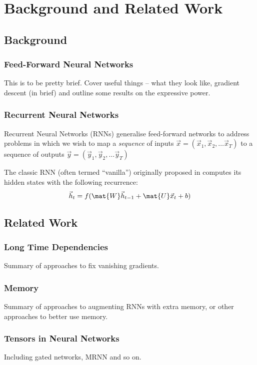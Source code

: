 \chapter{Background and Related Work}\label{C:bg}
\section{Background}
\subsection{Feed-Forward Neural Networks}
This is to be pretty brief. Cover useful things -- what they look like, gradient descent
(in brief) and outline some results on the expressive power.
\subsection{Recurrent Neural Networks}
Recurrent Neural Networks (RNNs) generalise feed-forward networks to address problems 
in which we wish to map a \emph{sequence} of inputs 
\(\vec{x} = (\vec{x}_1, \vec{x}_2, \dots \vec{x}_T) \) to a sequence of outputs
\(\vec{y} = (\vec{y}_1, \vec{y}_2, \dots \vec{y}_T) \)


The classic RNN (often termed ``vanilla'') originally proposed in \autocite{ElmanXXXX}
computes its hidden states with the following recurrence:
\begin{equation}
	\vec{h}_t = f(\mat{W}\vec{h}_{t-1} + \mat{U}\vec{x}_t +  b)
\label{eq:vanillarnn}
\end{equation}

\section{Related Work}
\subsection{Long Time Dependencies}
Summary of approaches to fix vanishing gradients.
\subsection{Memory}
Summary of approaches to augmenting RNNs with extra memory, or other approaches to better
use memory.
\subsection{Tensors in Neural Networks}
Including gated networks, MRNN and so on.
